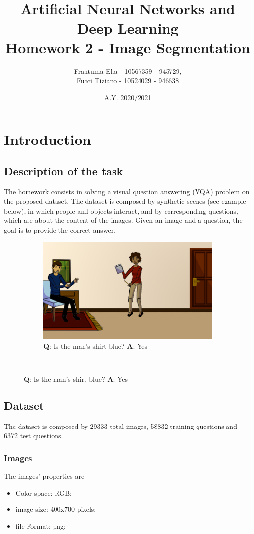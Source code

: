 \documentclass[12pt,a4paper]{report}
\title{Artificial Neural Networks and Deep Learning \\ Homework 2 - Image Segmentation}
\author{Frantuma Elia - 10567359 - 945729, \\
		Fucci Tiziano - 10524029 - 946638}
\date{A.Y. 2020/2021}
\begin{document}
	\maketitle
	\tableofcontents
	\chapter{Introduction}
		\section{Description of the task}
			The homework consists in solving a visual question answering (VQA) problem on the proposed dataset. The dataset is composed by synthetic scenes (see example below), in which people and objects interact, and by corresponding questions, which are about the content of the images. Given an image and a question, the goal is to provide the correct answer.

\begin{figure}[H]
\renewcommand*\thesubfigure{\arabic{subfigure}} 
\centering
\begin{subfigure}{.75\textwidth}
  \centering
  \includegraphics[width=1\linewidth]{image0}
  \caption{\textbf{Q}: Is the man's shirt blue? \textbf{A}: Yes}
  \label{fig:sub1}
\end{subfigure}\
\end{figure}

\section{Dataset}
The dataset is composed by 29333 total images, 58832 training questions and 6372 test questions.


	\subsection{Images}
The images' properties are:
\begin{itemize}
\item{Color space: RGB;}
\item{image size: 400x700 pixels;}
\item{file Format: png;}
\end{itemize}
\end{document}
